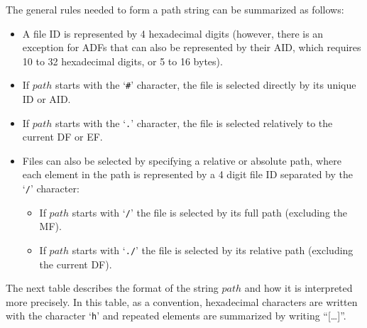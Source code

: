 \documentclass[11pt]{report}
\begin{document}
  The general rules needed to form a path string can be summarized as follows:
  \begin{itemize}
  \item{A file ID is represented by 4 hexadecimal digits 
    (however, there is an exception for ADFs that can also be represented by their AID, 
     which requires 10 to 32 hexadecimal digits, or 5 to 16 bytes).}
  \item{If $path$ starts with the `\texttt{\#}' character, the file is selected directly by its unique ID or AID.}
  \item{If $path$ starts with the `\texttt{.}' character, the file is selected relatively to the current DF or EF.}
  \item{Files can also be selected by specifying a relative or absolute path, 
    where each element in the path is represented by a 4 digit file ID separated by the `\texttt{/}' character:}
     \begin{itemize}
     \item{If $path$ starts with `\texttt{/}' the file is selected by its full path (excluding the MF).}
     \item{If $path$ starts with `\texttt{./}' the file is selected by its relative path (excluding the current DF).}
     \end{itemize}
  \end{itemize}

  The next table describes the format of the string $path$ and how it is interpreted more precisely. 
  In this table, as a convention, hexadecimal characters are written with the character `\texttt{h}' 
  and repeated elements are summarized by writing ``[\ldots ]''.
\end{document}
